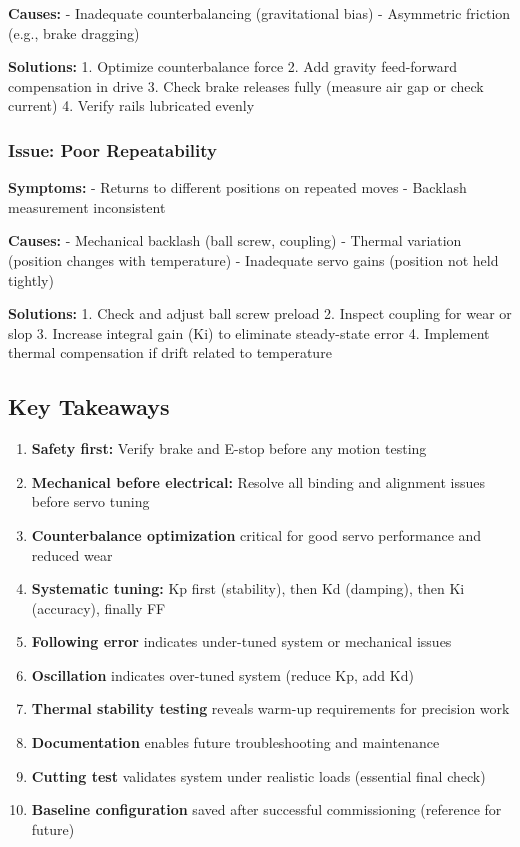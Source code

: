 \documentclass[
]{article}
\providecommand{\tightlist}{%
  \setlength{\itemsep}{0pt}\setlength{\parskip}{0pt}}
\begin{document}
\textbf{Causes:} - Inadequate counterbalancing (gravitational bias) -
Asymmetric friction (e.g., brake dragging)

\textbf{Solutions:} 1. Optimize counterbalance force 2. Add gravity
feed-forward compensation in drive 3. Check brake releases fully
(measure air gap or check current) 4. Verify rails lubricated evenly

\subsubsection{Issue: Poor
Repeatability}\label{issue-poor-repeatability}

\textbf{Symptoms:} - Returns to different positions on repeated moves -
Backlash measurement inconsistent

\textbf{Causes:} - Mechanical backlash (ball screw, coupling) - Thermal
variation (position changes with temperature) - Inadequate servo gains
(position not held tightly)

\textbf{Solutions:} 1. Check and adjust ball screw preload 2. Inspect
coupling for wear or slop 3. Increase integral gain (Ki) to eliminate
steady-state error 4. Implement thermal compensation if drift related to
temperature

\subsection{Key Takeaways}\label{key-takeaways-1}

\begin{enumerate}
\def\labelenumi{\arabic{enumi}.}
\tightlist
\item
  \textbf{Safety first:} Verify brake and E-stop before any motion
  testing
\item
  \textbf{Mechanical before electrical:} Resolve all binding and
  alignment issues before servo tuning
\item
  \textbf{Counterbalance optimization} critical for good servo
  performance and reduced wear
\item
  \textbf{Systematic tuning:} Kp first (stability), then Kd (damping),
  then Ki (accuracy), finally FF
\item
  \textbf{Following error} indicates under-tuned system or mechanical
  issues
\item
  \textbf{Oscillation} indicates over-tuned system (reduce Kp, add Kd)
\item
  \textbf{Thermal stability testing} reveals warm-up requirements for
  precision work
\item
  \textbf{Documentation} enables future troubleshooting and maintenance
\item
  \textbf{Cutting test} validates system under realistic loads
  (essential final check)
\item
  \textbf{Baseline configuration} saved after successful commissioning
  (reference for future)
\end{enumerate}
\end{document}
